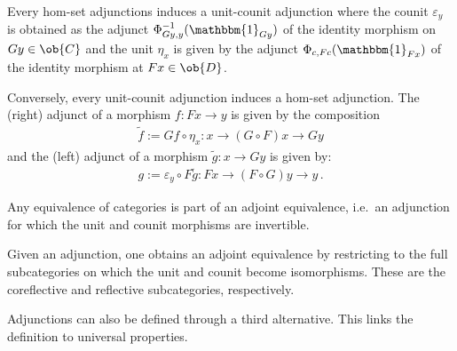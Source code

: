     \begin{property}[Equivalence]
        Every hom-set adjunctions induces a unit-counit adjunction where the counit $\varepsilon_y$ is obtained as the adjunct $\Phi^{-1}_{Gy,y}(\mathbbm{1}_{Gy})$ of the identity morphism on $Gy\in\ob{C}$ and the unit $\eta_x$ is given by the adjunct $\Phi_{c,Fc}(\mathbbm{1}_{Fx})$ of the identity morphism at $Fx\in\ob{D}$.

        Conversely, every unit-counit adjunction induces a hom-set adjunction. The (right) adjunct of a morphism $f:Fx\rightarrow y$ is given by the composition
        \begin{gather}
            \widetilde{f}:=Gf\circ\eta_x:x\rightarrow (G\circ F)x\rightarrow Gy
        \end{gather}
        and the (left) adjunct of a morphism $\widetilde{g}:x\rightarrow Gy$ is given by:
        \begin{gather}
            g:=\varepsilon_y\circ F\tilde{g}:Fx\rightarrow(F\circ G)y\rightarrow y\,.
        \end{gather}
    \end{property}


    \begin{property}
        Any equivalence of categories is part of an adjoint equivalence, i.e.~an adjunction for which the unit and counit morphisms are invertible.
    \end{property}
    \begin{property}\label{cat:adjoint_equivalence}
        Given an adjunction, one obtains an adjoint equivalence by restricting to the full subcategories on which the unit and counit become isomorphisms. These are the coreflective and reflective subcategories, respectively.
    \end{property}

    Adjunctions can also be defined through a third alternative. This links the definition to universal properties.

